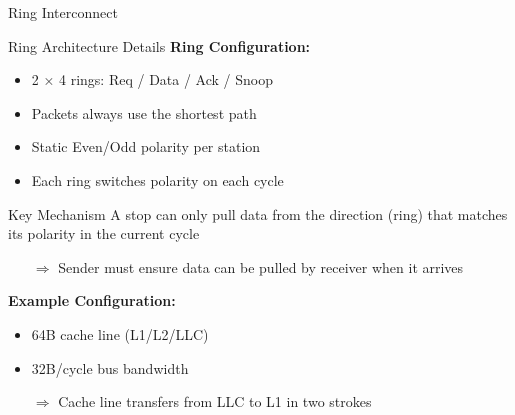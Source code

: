 \documentclass[aspectratio=169,12pt]{beamer}
\begin{document}
\begin{frame}{Ring Interconnect}
\begin{center}
\end{center}
\end{frame}

\begin{frame}{Ring Architecture Details}
\textbf{Ring Configuration:}
\begin{itemize}
\item 2 × 4 rings: Req / Data / Ack / Snoop
\item Packets always use the shortest path
\item Static Even/Odd polarity per station
\item Each ring switches polarity on each cycle
\end{itemize}

\vspace{1em}
\begin{block}{Key Mechanism}
A stop can only pull data from the direction (ring) that matches its polarity in the current cycle
\begin{itemize}
\item[$\Rightarrow$] Sender must ensure data can be pulled by receiver when it arrives
\end{itemize}
\end{block}

\textbf{Example Configuration:}
\begin{itemize}
\item 64B cache line (L1/L2/LLC)
\item 32B/cycle bus bandwidth
\item[$\Rightarrow$] Cache line transfers from LLC to L1 in two strokes
\end{itemize}
\end{frame}
\end{document}
